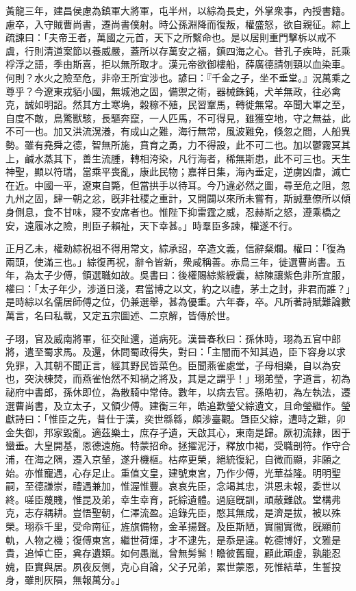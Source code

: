 \begin{pinyinscope}
黃龍三年，建昌侯慮為鎮軍大將軍，屯半州，以綜為長史，外掌衆事，內授書籍。慮卒，入守賊曹尚書，遷尚書僕射。時公孫淵降而復叛，權盛怒，欲自親征。綜上疏諫曰：「夫帝王者，萬國之元首，天下之所繫命也。是以居則重門擊柝以戒不虞，行則清道案節以養威嚴，蓋所以存萬安之福，鎮四海之心。昔孔子疾時，託乘桴浮之語，季由斯喜，拒以無所取才。漢元帝欲御樓船，薛廣德請刎頸以血染車。何則？水火之險至危，非帝王所宜涉也。諺曰：『千金之子，坐不垂堂。』況萬乘之尊乎？今遼東戎貊小國，無城池之固，備禦之術，器械銖鈍，犬羊無政，往必禽克，誠如明詔。然其方土寒埆，穀稼不殖，民習鞌馬，轉徙無常。卒聞大軍之至，自度不敵，鳥驚獸駭，長驅奔竄，一人匹馬，不可得見，雖獲空地，守之無益，此不可一也。加又洪流滉瀁，有成山之難，海行無常，風波難免，倏忽之間，人船異勢。雖有堯舜之德，智無所施，賁育之勇，力不得設，此不可二也。加以鬱霧冥其上，鹹水蒸其下，善生流腫，轉相洿染，凡行海者，稀無斯患，此不可三也。天生神聖，顯以符瑞，當乘平喪亂，康此民物；嘉祥日集，海內垂定，逆虜凶虐，滅亡在近。中國一平，遼東自斃，但當拱手以待耳。今乃違必然之圖，尋至危之阻，忽九州之固，肆一朝之忿，旣非社稷之重計，又開闢以來所未嘗有，斯誠羣僚所以傾身側息，食不甘味，寢不安席者也。惟陛下抑雷霆之威，忍赫斯之怒，遵乘橋之安，遠履冰之險，則臣子賴祉，天下幸甚。」時羣臣多諫，權遂不行。

正月乙未，權勑綜祝祖不得用常文，綜承詔，卒造文義，信辭粲爛。權曰：「復為兩頭，使滿三也。」綜復再祝，辭令皆新，衆咸稱善。赤烏三年，徙選曹尚書。五年，為太子少傅，領選職如故。吳書曰：後權賜綜紫綬囊，綜陳讓紫色非所宜服，權曰：「太子年少，涉道日淺，君當博之以文，約之以禮，茅土之封，非君而誰？」是時綜以名儒居師傅之位，仍兼選舉，甚為優重。六年春，卒。凡所著詩賦難論數萬言，名曰私載，又定五宗圖述、二京解，皆傳於世。

子珝，官及威南將軍，征交阯還，道病死。漢晉春秋曰：孫休時，珝為五官中郎將，遣至蜀求馬。及還，休問蜀政得失，對曰：「主闇而不知其過，臣下容身以求免罪，入其朝不聞正言，經其野民皆菜色。臣聞燕雀處堂，子母相樂，自以為安也，突決棟焚，而燕雀怡然不知禍之將及，其是之謂乎！」珝弟瑩，字道言，初為祕府中書郎，孫休即位，為散騎中常侍。數年，以病去官。孫皓初，為左執法，遷選曹尚書，及立太子，又領少傅。建衡三年，皓追歎瑩父綜遺文，且命瑩繼作。瑩獻詩曰：「惟臣之先，昔仕于漢，奕世緜緜，頗涉臺觀。曁臣父綜，遭時之難，卯金失御，邦家毀亂。適茲樂土，庶存孑遺，天啟其心，東南是歸。厥初流隷，困于蠻垂。大皇開基，恩德遠施。特蒙招命。拯擢泥汙，釋放巾褐，受職剖符。作守合浦，在海之隅，遷入京輦，遂升機樞。枯瘁更榮，絕統復紀，自微而顯，非願之始。亦惟寵遇，心存足止。重值文皇，建號東宮，乃作少傅，光華益隆。明明聖嗣，至德謙崇，禮遇兼加，惟渥惟豐。哀哀先臣，念竭其忠，洪恩未報，委世以終。嗟臣蔑賤，惟昆及弟，幸生幸育，託綜遺體。過庭旣訓，頑蔽難啟。堂構弗克，志存耦耕。豈悟聖朝，仁澤流盈。追錄先臣，愍其無成，是濟是拔，被以殊榮。珝忝千里，受命南征，旌旗備物，金革揚聲。及臣斯陋，實闇實微，旣顯前軌，人物之機；復傅東宮，繼世荷煇，才不逮先，是忝是違。乾德博好，文雅是貴，追悼亡臣，兾存遺類。如何愚胤，曾無髣髴！瞻彼舊寵，顧此頑虛，孰能忍媿，臣實與居。夙夜反側，克心自論，父子兄弟，累世蒙恩，死惟結草，生誓投身，雖則灰隕，無報萬分。」


\end{pinyinscope}
